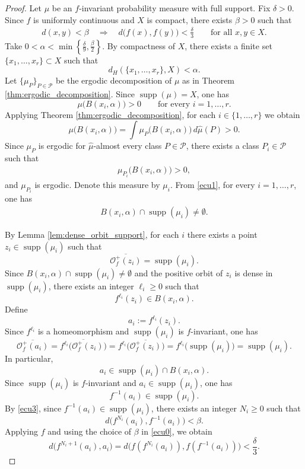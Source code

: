 \documentclass[10pt,a4paper]{amsart}
\DeclareMathOperator{\supp}{supp}
\begin{document}
\begin{proof}
Let $\mu$ be an $f$-invariant probability measure with full support. Fix $\delta>0$. Since $f$ is uniformly continuous and $X$ is compact, there exists $\beta>0$ such that
\begin{eqnarray}\label{ecu0}
d(x,y)<\beta
\quad\Longrightarrow\quad
d\bigl(f(x),f(y)\bigr)<\frac{\delta}{3}
\qquad\text{for all }x,y\in X.
\end{eqnarray}
Take $0<\alpha<\min \left\{\frac{\delta}{9},\frac{\beta}{2}\right\}$. By compactness of $X$, there exists a finite set $\{x_1,\dots,x_r\}\subset X$ such that
\[
d_H(\{x_1,\dots,x_r\},X)<\alpha.
\]
Let $\{\mu_P\}_{P\in\mathcal P}$ be the ergodic decomposition of $\mu$ as in Theorem \ref{thm:ergodic_decomposition}. Since $\supp(\mu)=X$, one has
\[
\mu\bigl(B(x_i,\alpha)\bigr)>0
\qquad\text{for every } i=1,\dots,r.
\]
Applying Theorem \ref{thm:ergodic_decomposition}, for each $i\in\{1,\dots,r\}$ we obtain
\[
\mu\bigl(B(x_i,\alpha)\bigr)
=
\int \mu_P\bigl(B(x_i,\alpha)\bigr)\,d\hat\mu(P)>0.
\]
Since $\mu_P$ is ergodic for $\hat\mu$-almost every class $P\in\mathcal P$, there exists a class $P_i\in\mathcal P$ such that
\begin{eqnarray}\label{ecu1}
\mu_{P_i}\bigl(B(x_i,\alpha)\bigr)>0,
\end{eqnarray}
and $\mu_{P_i}$ is ergodic. Denote this measure by $\mu_i$. From \eqref{ecu1}, for every $i=1,\ldots,r$, one has
\begin{eqnarray}\label{ecu2}
B(x_i,\alpha)\cap \supp(\mu_i)\neq\emptyset.
\end{eqnarray}

By Lemma \ref{lem:dense_orbit_support}, for each $i$ there exists a point $z_i\in \supp(\mu_i)$ such that
\[
\overline{\mathcal O_f^+(z_i)}=\supp(\mu_i).
\]
Since $B(x_i,\alpha)\cap \supp(\mu_i)\neq\emptyset$ and the positive orbit of $z_i$ is dense in $\supp(\mu_i)$, there exists an integer $\ell_i\ge0$ such that
\[
f^{\ell_i}(z_i)\in B(x_i,\alpha).
\]
Define
\[
a_i:=f^{\ell_i}(z_i).
\]
Since $f^{\ell_i}$ is a homeomorphism and $\supp(\mu_i)$ is $f$-invariant, one has
\begin{equation}\label{ecu3}
\overline{\mathcal O_f^+(a_i)}
=
\overline{f^{\ell_i}\bigl(\mathcal O_f^+(z_i)\bigr)}
=
f^{\ell_i}\bigl(\overline{\mathcal O_f^+(z_i)}\bigr)
=
f^{\ell_i}\bigl(\supp(\mu_i)\bigr)
=
\supp(\mu_i).
\end{equation}
In particular,
\[
a_i\in \supp(\mu_i)\cap B(x_i,\alpha).
\]
Since $\supp(\mu_i)$ is $f$-invariant and $a_i\in \supp(\mu_i)$, one has
\[
f^{-1}(a_i)\in \supp(\mu_i).
\]
By \eqref{ecu3}, since $f^{-1}(a_i)\in \supp(\mu_i)$, there exists an integer $N_i\ge0$ such that
\[
d\bigl(f^{N_i}(a_i),f^{-1}(a_i)\bigr)<\beta.
\]
Applying $f$ and using the choice of $\beta$ in \eqref{ecu0}, we obtain
\[
d\bigl(f^{N_i+1}(a_i),a_i\bigr)
=
d\bigl(f(f^{N_i}(a_i)),f(f^{-1}(a_i))\bigr)
<
\frac{\delta}{3}.
\]


\end{proof}
\end{document}
